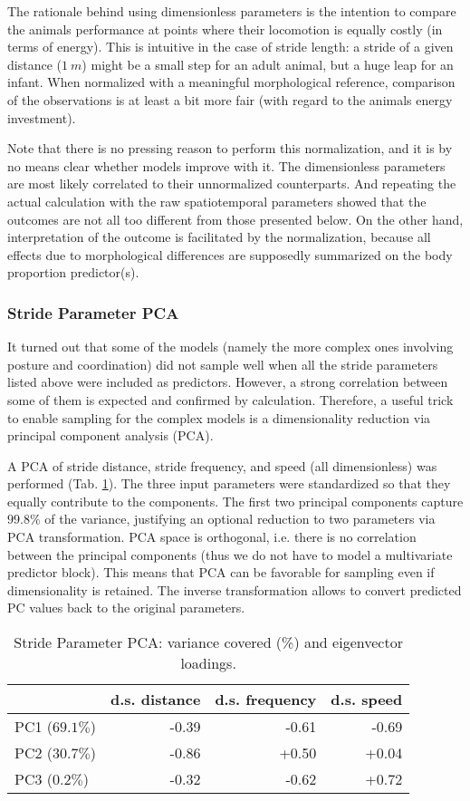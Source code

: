 The rationale behind using dimensionless parameters is the intention to compare the animals performance at points where their locomotion is equally costly (in terms of energy).
This is intuitive in the case of stride length: a stride of a given distance (\(1\ m\)) might be a small step for an adult animal, but a huge leap for an infant.
When normalized with a meaningful morphological reference, comparison of the observations is at least a bit more fair (with regard to the animals energy investment).

Note that there is no pressing reason to perform this normalization, and it is by no means clear whether models improve with it.
The dimensionless parameters are most likely correlated to their unnormalized counterparts.
And repeating the actual calculation with the raw spatiotemporal parameters showed that the outcomes are not all too different from those presented below.
On the other hand, interpretation of the outcome is facilitated by the normalization, because all effects due to morphological differences are supposedly summarized on the body proportion predictor(s).


\subsubsection{Stride Parameter PCA}
\label{prep:stridepca}
It turned out that some of the models (namely the more complex ones involving posture and coordination) did not sample well when all the stride parameters listed above were included as predictors.
However, a strong correlation between some of them is expected and confirmed by calculation.
Therefore, a useful trick to enable sampling for the complex models is a dimensionality reduction via principal component analysis (PCA).

A PCA of stride distance, stride frequency, and speed (all dimensionless) was performed (Tab. \ref{tab:stridepca}).
The three input parameters were standardized so that they equally contribute to the components.
The first two principal components capture \(99.8 \%\) of the variance, justifying an optional reduction to two parameters via PCA transformation.
PCA space is orthogonal, i.e. there is no correlation between the principal components (thus we do not have to model a multivariate predictor block).
This means that PCA can be favorable for sampling even if dimensionality is retained.
The inverse transformation allows to convert predicted PC values back to the original parameters.
\bigskip

\begin{table}[htbp]
\caption{\label{tab:stridepca}Stride Parameter PCA: variance covered (\%) and eigenvector loadings.}
\centering
\begin{tabular}{lrrr}
 & d.s. distance & d.s. frequency & d.s. speed\\[0pt]
\hline
PC1 (\(69.1 \%\)) & -0.39 & -0.61 & -0.69\\[0pt]
PC2 (\(30.7 \%\)) & -0.86 & +0.50 & +0.04\\[0pt]
PC3 (\(0.2 \%\)) & -0.32 & -0.62 & +0.72\\[0pt]
\end{tabular}
\end{table}

